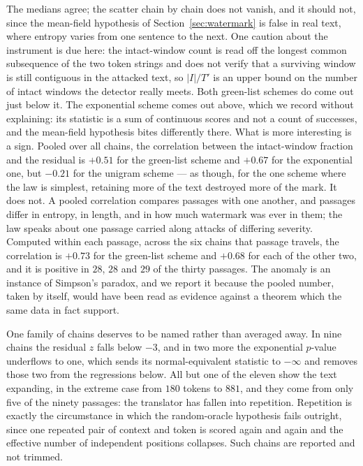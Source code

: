 \documentclass[11pt,a4paper]{article}
\theoremstyle{plain}
\theoremstyle{definition}
\numberwithin{equation}{section}
\begin{document}
The medians agree; the scatter chain by chain does not vanish, and it
should not, since the mean-field hypothesis of
Section~\ref{sec:watermark} is false in real text, where entropy varies
from one sentence to the next. One caution about the instrument is due
here: the intact-window count is read off the longest common
subsequence of the two token strings and does not verify that a
surviving window is still contiguous in the attacked text, so $|I|/T'$
is an upper bound on the number of intact windows the detector really
meets. Both green-list schemes do come out just below it. The
exponential scheme comes out above, which we record without explaining:
its statistic is a sum of continuous scores and not a count of
successes, and the mean-field hypothesis bites differently there. What is more interesting is a sign.
Pooled over all chains, the correlation between the intact-window
fraction and the residual is $+0.51$ for the green-list scheme and
$+0.67$ for the exponential one, but $-0.21$ for the unigram scheme ---
as though, for the one scheme where the law is simplest, retaining more
of the text destroyed more of the mark. It does not. A pooled
correlation compares passages with one another, and passages differ in
entropy, in length, and in how much watermark was ever in them; the law
speaks about one passage carried along attacks of differing severity.
Computed within each passage, across the six chains that passage
travels, the correlation is $+0.73$ for the green-list scheme and
$+0.68$ for each of the other two, and it is positive in $28$, $28$ and
$29$ of the thirty passages. The anomaly is
an instance of Simpson's paradox, and we report it because the pooled
number, taken by itself, would have been read as evidence against a
theorem which the same data in fact support.

One family of chains deserves to be named rather than averaged away. In
nine chains the residual $z$ falls below $-3$, and in two more the
exponential $p$-value underflows to one, which sends its
normal-equivalent statistic to $-\infty$ and removes those two from the
regressions below. All but one of the eleven show the text expanding,
in the extreme case from $180$ tokens to $881$, and they come from only
five of the ninety passages: the translator has fallen into repetition.
Repetition is exactly the circumstance in which the random-oracle
hypothesis fails outright, since one repeated pair of context and token
is scored again and again and the effective number of independent
positions collapses. Such chains are reported and not trimmed.
\end{document}
